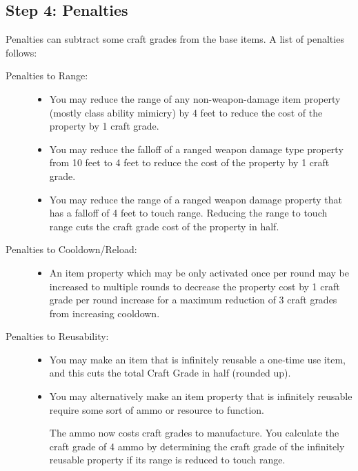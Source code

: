\subsection{Step 4: Penalties}
Penalties can subtract some craft grades from the base items. A list of penalties follows:
\begin{description}
	\item[Penalties to Range:] \hfill
	\begin{itemize}
		\item You may reduce the range of any non-weapon-damage item property (mostly class ability mimicry) by 4 feet to reduce the cost of the property by 1 craft grade.
		\item You may reduce the falloff of a ranged weapon damage type property from 10 feet to 4 feet to reduce the cost of the property by 1 craft grade.
		\item You may reduce the range of a ranged weapon damage property that has a falloff of 4 feet to touch range. Reducing the range to touch range cuts the craft grade cost of the property in half.
	\end{itemize}
	\item[Penalties to Cooldown/Reload:] \hfill
	\begin{itemize}
		\item An item property which may be only activated once per round may be increased to multiple rounds to decrease the property cost by 1 craft grade per round increase for a maximum reduction of 3 craft grades from increasing cooldown.
	\end{itemize}
	\item[Penalties to Reusability:] \hfill
	\begin{itemize}
		\item You may make an item that is infinitely reusable a one-time use item, and this cuts the total Craft Grade in half (rounded up).
		\item You may alternatively make an item property that is infinitely reusable require some sort of ammo or resource to function.
		
		The ammo now costs craft grades to manufacture. You calculate the craft grade of 4 ammo by determining the craft grade of the infinitely reusable property if its range is reduced to touch range.
		

\end{itemize}
\end{description}
